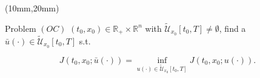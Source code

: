 \begin{frame}[plain]
	\begin{textblock*}{110mm}(10mm,20mm)
		\begin{graybox}{Problem $(OC)$}
			$(t_0,x_0)\in \mathbb{R}_{+}\times \mathbb{R}^n$ with $\tilde{\mathcal{U}}_{x_0}[t_0,T]\neq\emptyset$, find a $\bar{u}(\cdot)\in \tilde{\mathcal{U}}_{x_0}[t_0,T]$ s.t.
			
			\begin{equation*}
				J(t_0,x_0;\bar{u}(\cdot))=\inf_{u(\cdot)\in \tilde{\mathcal{U}}_{x_0}[t_0,T]} J(t_0,x_0;u(\cdot)).
			\end{equation*}
		\end{graybox}
	\end{textblock*}
\end{frame}
